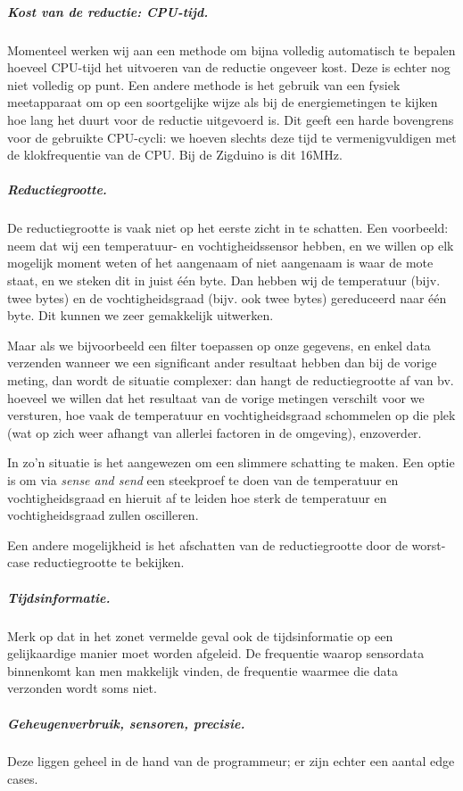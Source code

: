 \documentclass{article}
\begin{document}
\subparagraph{Kost van de reductie: CPU-tijd.} Momenteel werken wij aan een
methode om bijna volledig automatisch te bepalen hoeveel CPU-tijd het uitvoeren
van de reductie ongeveer kost. Deze is echter nog niet volledig op punt. Een
andere methode is het gebruik van een fysiek meetapparaat om op een soortgelijke
wijze als bij de energiemetingen te kijken hoe lang het duurt voor de reductie
uitgevoerd is. Dit geeft een harde bovengrens voor de gebruikte CPU-cycli: we
hoeven slechts deze tijd te vermenigvuldigen met de klokfrequentie van de
CPU. Bij de Zigduino is dit 16MHz.

\subparagraph{Reductiegrootte.} De reductiegrootte is vaak
niet op het eerste zicht in te schatten. Een voorbeeld: neem dat wij een
temperatuur- en vochtigheidssensor hebben, en we willen op elk mogelijk moment
weten of het aangenaam of niet aangenaam is waar de mote staat, en we steken dit
in juist één byte. Dan hebben wij de temperatuur (bijv. twee bytes) en de
vochtigheidsgraad (bijv. ook twee bytes) gereduceerd naar \'e\'en byte. Dit
kunnen we zeer gemakkelijk uitwerken.

Maar als we bijvoorbeeld een filter toepassen op onze gegevens, en enkel data
verzenden wanneer we een significant ander resultaat hebben dan bij de vorige
meting, dan wordt de situatie complexer: dan hangt de reductiegrootte af van
bv. hoeveel we willen dat het resultaat van de vorige metingen verschilt voor we
versturen, hoe vaak de temperatuur en vochtigheidsgraad schommelen op die plek
(wat op zich weer afhangt van allerlei factoren in de omgeving), enzoverder.

In zo'n situatie is het aangewezen om een slimmere schatting te maken. Een optie
is om via \textit{sense and send} een steekproef te doen van de temperatuur en
vochtigheidsgraad en hieruit af te leiden hoe sterk de temperatuur en
vochtigheidsgraad zullen oscilleren.

Een andere mogelijkheid is het afschatten van de reductiegrootte door de
worst-case reductiegrootte te bekijken.

\subparagraph{Tijdsinformatie.} Merk op dat in het zonet vermelde geval ook de
tijdsinformatie op een gelijkaardige manier moet worden afgeleid. De frequentie
waarop sensordata binnenkomt kan men makkelijk vinden, de frequentie waarmee die
data verzonden wordt soms niet. 

\subparagraph{Geheugenverbruik, sensoren, precisie.} Deze liggen geheel in de
hand van de programmeur; er zijn echter een aantal edge cases. 
\end{document}
